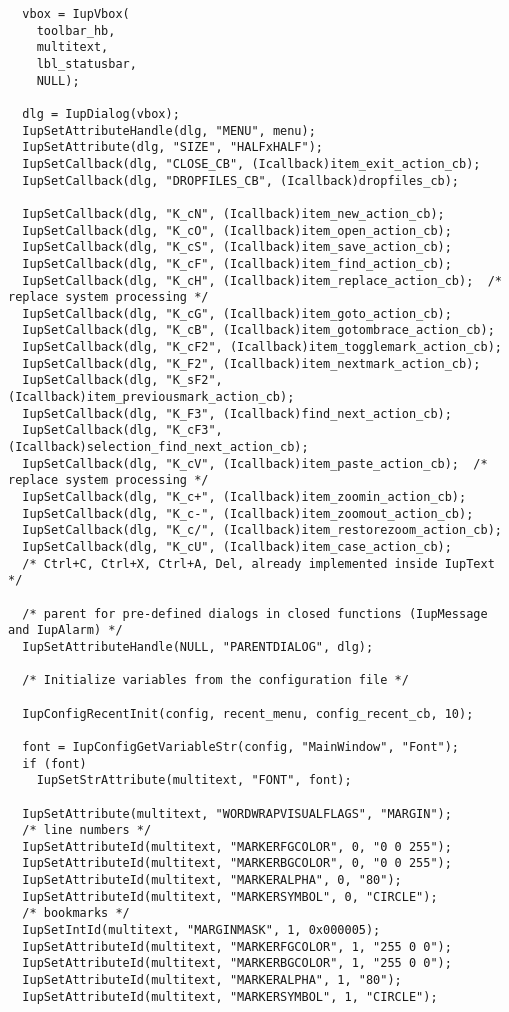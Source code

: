 \documentclass{ctexart}
\begin{document}
\begin{lstlisting}
  vbox = IupVbox(
    toolbar_hb,
    multitext,
    lbl_statusbar,
    NULL);

  dlg = IupDialog(vbox);
  IupSetAttributeHandle(dlg, "MENU", menu);
  IupSetAttribute(dlg, "SIZE", "HALFxHALF");
  IupSetCallback(dlg, "CLOSE_CB", (Icallback)item_exit_action_cb);
  IupSetCallback(dlg, "DROPFILES_CB", (Icallback)dropfiles_cb);

  IupSetCallback(dlg, "K_cN", (Icallback)item_new_action_cb);
  IupSetCallback(dlg, "K_cO", (Icallback)item_open_action_cb);
  IupSetCallback(dlg, "K_cS", (Icallback)item_save_action_cb);
  IupSetCallback(dlg, "K_cF", (Icallback)item_find_action_cb);
  IupSetCallback(dlg, "K_cH", (Icallback)item_replace_action_cb);  /* replace system processing */
  IupSetCallback(dlg, "K_cG", (Icallback)item_goto_action_cb);
  IupSetCallback(dlg, "K_cB", (Icallback)item_gotombrace_action_cb);
  IupSetCallback(dlg, "K_cF2", (Icallback)item_togglemark_action_cb);
  IupSetCallback(dlg, "K_F2", (Icallback)item_nextmark_action_cb);
  IupSetCallback(dlg, "K_sF2", (Icallback)item_previousmark_action_cb);
  IupSetCallback(dlg, "K_F3", (Icallback)find_next_action_cb);
  IupSetCallback(dlg, "K_cF3", (Icallback)selection_find_next_action_cb);
  IupSetCallback(dlg, "K_cV", (Icallback)item_paste_action_cb);  /* replace system processing */
  IupSetCallback(dlg, "K_c+", (Icallback)item_zoomin_action_cb);
  IupSetCallback(dlg, "K_c-", (Icallback)item_zoomout_action_cb);
  IupSetCallback(dlg, "K_c/", (Icallback)item_restorezoom_action_cb);
  IupSetCallback(dlg, "K_cU", (Icallback)item_case_action_cb);
  /* Ctrl+C, Ctrl+X, Ctrl+A, Del, already implemented inside IupText */

  /* parent for pre-defined dialogs in closed functions (IupMessage and IupAlarm) */
  IupSetAttributeHandle(NULL, "PARENTDIALOG", dlg);

  /* Initialize variables from the configuration file */

  IupConfigRecentInit(config, recent_menu, config_recent_cb, 10);

  font = IupConfigGetVariableStr(config, "MainWindow", "Font");
  if (font)
    IupSetStrAttribute(multitext, "FONT", font);

  IupSetAttribute(multitext, "WORDWRAPVISUALFLAGS", "MARGIN");
  /* line numbers */
  IupSetAttributeId(multitext, "MARKERFGCOLOR", 0, "0 0 255");
  IupSetAttributeId(multitext, "MARKERBGCOLOR", 0, "0 0 255");
  IupSetAttributeId(multitext, "MARKERALPHA", 0, "80");
  IupSetAttributeId(multitext, "MARKERSYMBOL", 0, "CIRCLE");
  /* bookmarks */
  IupSetIntId(multitext, "MARGINMASK", 1, 0x000005);
  IupSetAttributeId(multitext, "MARKERFGCOLOR", 1, "255 0 0");
  IupSetAttributeId(multitext, "MARKERBGCOLOR", 1, "255 0 0");
  IupSetAttributeId(multitext, "MARKERALPHA", 1, "80");
  IupSetAttributeId(multitext, "MARKERSYMBOL", 1, "CIRCLE");


\end{lstlisting}
\end{document}
